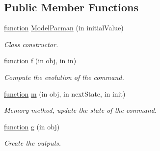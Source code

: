 \subsection*{Public Member Functions}
\begin{DoxyCompactItemize}
\item 
\hyperlink{_plan__desuma_functions__2_players_8m_ac2ffb26d6f42d3bbcd7847b0873403f4}{function} \hyperlink{class_model_pacman_aeece945de8fe29ca408290f87392ac3d}{Model\+Pacman} (in initial\+Value)
\begin{DoxyCompactList}\small\item\em Class constructor. \end{DoxyCompactList}\item 
\hyperlink{_plan__desuma_functions__2_players_8m_ac2ffb26d6f42d3bbcd7847b0873403f4}{function} \hyperlink{class_model_pacman_a6f3b146c92a207e95690d08975e1e072}{f} (in obj, in in)
\begin{DoxyCompactList}\small\item\em Compute the evolution of the command. \end{DoxyCompactList}\item 
\hyperlink{_plan__desuma_functions__2_players_8m_ac2ffb26d6f42d3bbcd7847b0873403f4}{function} \hyperlink{class_model_pacman_a3140f24c6c4b80037b7d4f521c6ae2d3}{m} (in obj, in next\+State, in init)
\begin{DoxyCompactList}\small\item\em Memory method, update the state of the command. \end{DoxyCompactList}\item 
\hyperlink{_plan__desuma_functions__2_players_8m_ac2ffb26d6f42d3bbcd7847b0873403f4}{function} \hyperlink{class_model_pacman_a07dadfabe92bf9a144b8a862720e7746}{g} (in obj)
\begin{DoxyCompactList}\small\item\em Create the outputs. \end{DoxyCompactList}\end{DoxyCompactItemize}
